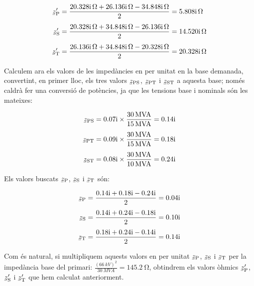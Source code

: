 \begin{exemple}[\ImpCircEqTrafoTresDeb{}]
    \begin{align*}
        \cmplx{z}\ped{P}' &=  \frac{\complexqty{j 20,328}{\ohm} + \complexqty{j 26,136}{\ohm} - \complexqty{j 34,848}{\ohm}}{2} = \complexqty{j 5,808}{\ohm} \\[1ex]
        \cmplx{z}\ped{S}' &=  \frac{\complexqty{j 20,328}{\ohm} + \complexqty{j 34,848}{\ohm} - \complexqty{j 26,136}{\ohm}}{2} = \complexqty{j 14,520}{\ohm} \\[1ex]
        \cmplx{z}\ped{T}' &=  \frac{\complexqty{j 26,136}{\ohm} + \complexqty{j 34,848}{\ohm} - \complexqty{j 20,328}{\ohm}}{2} = \complexqty{j 20,328}{\ohm}
    \end{align*}

    Calculem ara els valors de les impedàncies en per unitat en la base demanada, convertint, en primer lloc, els tres valors $\cmplx{z}\ped{PS}$, $\cmplx{z}\ped{PT}$ i $\cmplx{z}\ped{ST}$ a aquesta base; només caldrà fer una conversió de potències, ja que les tensions base i nominals són les mateixes:

    \begin{align*}
        \cmplx{z}\ped{PS} &=  \complexnum{j 0,07} \times \frac{\qty{30}{MVA}}{\qty{15}{MVA}} = \complexnum{j 0,14}\\[1ex]
        \cmplx{z}\ped{PT} &=  \complexnum{j 0,09} \times \frac{\qty{30}{MVA}}{\qty{15}{MVA}} = \complexnum{j 0,18}\\[1ex]
        \cmplx{z}\ped{ST} &=  \complexnum{j 0,08} \times \frac{\qty{30}{MVA}}{\qty{10}{MVA}} = \complexnum{j 0,24}
    \end{align*}

    Els valors buscats $\cmplx{z}\ped{P}$, $\cmplx{z}\ped{S}$ i $\cmplx{z}\ped{T}$ són:

    \begin{align*}
        \cmplx{z}\ped{P} &=  \frac{\complexnum{j 0,14} + \complexnum{j 0,18} - \complexnum{j 0,24}}{2} = \complexnum{j 0,04} \\[1ex]
        \cmplx{z}\ped{S} &=  \frac{\complexnum{j 0,14} + \complexnum{j 0,24} - \complexnum{j 0,18}}{2} = \complexnum{j 0,10} \\[1ex]
        \cmplx{z}\ped{T} &=  \frac{\complexnum{j 0,18} + \complexnum{j 0,24} - \complexnum{j 0,14}}{2} = \complexnum{j 0,14}
    \end{align*}

     Com és natural, si multipliquem aquests valors en per unitat  $\cmplx{z}\ped{P}$, $\cmplx{z}\ped{S}$ i $\cmplx{z}\ped{T}$ per la impedància base del primari: $\frac{(\qty{66}{kV})^2}{\qty{30}{MVA}}=\qty{145,2}{\ohm}$, obtindrem els valors òhmics $\cmplx{z}\ped{P}'$,     $\cmplx{z}\ped{S}'$ i $\cmplx{z}\ped{T}'$ que hem calculat anteriorment.

\end{exemple}



